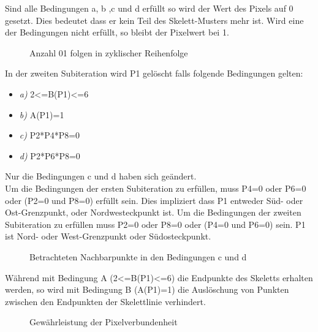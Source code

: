 Sind alle Bedingungen a, b ,c und d erfüllt so wird der Wert des Pixels auf 0 gesetzt.
Dies bedeutet dass er kein Teil des Skelett-Musters mehr ist.
Wird eine der Bedingungen nicht erfüllt, so bleibt der Pixelwert bei 1.\\
\begin{figure}[!ht]
  \centering
   \caption{Anzahl 01 folgen in zyklischer Reihenfolge  }
\end{figure}
In der zweiten Subiteration wird P1 gelöscht falls folgende Bedingungen gelten:
\begin{itemize} 
\item \emph{a)}  2<=B(P1)<=6 
\item \emph{b)}  A(P1)=1 
\item \emph{c)}  P2*P4*P8=0 
\item \emph{d)}  P2*P6*P8=0
\end{itemize}
Nur die Bedingungen c und d haben sich geändert.\\
Um die Bedingungen der ersten Subiteration zu erfüllen, muss
P4=0 oder P6=0 oder (P2=0 und P8=0)  erfüllt sein.
Dies impliziert dass P1 entweder Süd- oder Ost-Grenzpunkt, oder Nordwesteckpunkt ist.
Um die Bedingungen der zweiten Subiteration zu erfüllen muss
P2=0 oder P8=0 oder (P4=0 und P6=0) sein.
P1 ist Nord- oder West-Grenzpunkt oder Südosteckpunkt.
\begin{figure}[!ht]
  \centering
   \caption{Betrachteten Nachbarpunkte in den Bedingungen c und d}
\end{figure}
Während mit Bedingung A (2<=B(P1)<=6) die Endpunkte des Skeletts erhalten werden, so wird mit Bedingung B (A(P1)=1) die Auslöschung von Punkten zwischen den Endpunkten der Skelettlinie verhindert.\\
\begin{figure}[!ht]
  \centering
   \caption{Gewährleistung der Pixelverbundenheit}
\end{figure}

